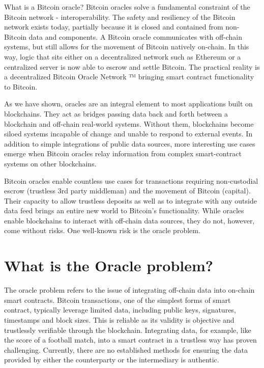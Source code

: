 \documentclass[twoside, a4paper, 11pt]{article}
\begin{document}
  What is a Bitcoin oracle? Bitcoin oracles solve a fundamental constraint of the Bitcoin network - interoperability. The safety and resiliency of the Bitcoin network exists today, partially because it is closed and contained from non-Bitcoin data and components. A Bitcoin oracle communicates with off-chain systems, but still allows for the movement of Bitcoin natively on-chain. In this way, logic that sits either on a decentralized network such as Ethereum or a centralized server is now able to escrow and settle Bitcoin. The practical reality is a decentralized Bitcoin Oracle Network ™ bringing smart contract functionality to Bitcoin.

  As we have shown, oracles are an integral element to most applications built on blockchains. They act as bridges passing data back and forth between a blockchain and off-chain real-world systems. Without them, blockchains become siloed systems incapable of change and unable to respond to external events. In addition to simple integrations of public data sources, more interesting use cases emerge when Bitcoin oracles relay information from complex smart-contract systems on other blockchains.

  Bitcoin oracles enable countless use cases for transactions requiring non-custodial escrow (trustless 3rd party middleman) and the movement of Bitcoin (capital). Their capacity to allow trustless deposits as well as to integrate with any outside data feed brings an entire new world to Bitcoin’s functionality. While oracles enable blockchains to interact with off-chain data sources, they do not, however, come without risks. One well-known risk is the oracle problem.

  \section{What is the Oracle problem?}

  The oracle problem refers to the issue of integrating off-chain data into on-chain smart contracts. Bitcoin transactions, one of the simplest forms of smart contract, typically leverage limited data, including public keys, signatures, timestamps and block sizes. This is reliable as its validity is objective and trustlessly verifiable through the blockchain. Integrating data, for example, like the score of a football match, into a smart contract in a trustless way has proven challenging. Currently, there are no established methods for ensuring the data provided by either the counterparty or the intermediary is authentic.
\end{document}
